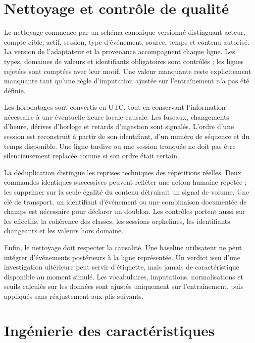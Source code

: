 \documentclass[11pt,a4paper,oneside]{report}
\theoremstyle{definition}
\theoremstyle{plain}
\begin{document}
\section{Nettoyage et contrôle de qualité}

Le nettoyage commence par un schéma canonique versionné distinguant acteur,
compte cible, actif, session, type d'événement, source, temps et contenu
autorisé. La version de l'adaptateur et la provenance accompagnent chaque
ligne. Les types, domaines de valeurs et identifiants obligatoires sont
contrôlés ; les lignes rejetées sont comptées avec leur motif. Une valeur
manquante reste explicitement manquante tant qu'une règle d'imputation ajustée
sur l'entraînement n'a pas été définie.

Les horodatages sont convertis en UTC, tout en conservant l'information
nécessaire à une éventuelle heure locale causale. Les fuseaux, changements
d'heure, dérives d'horloge et retards d'ingestion sont signalés. L'ordre d'une
session est reconstruit à partir de son identifiant, d'un numéro de séquence et
du temps disponible. Une ligne tardive ou une session tronquée ne doit pas être
silencieusement replacée comme si son ordre était certain.

La déduplication distingue les reprises techniques des répétitions réelles. Deux
commandes identiques successives peuvent refléter une action humaine répétée ;
les supprimer sur la seule égalité du contenu détruirait un signal de volume.
Une clé de transport, un identifiant d'événement ou une combinaison documentée
de champs est nécessaire pour déclarer un doublon. Les contrôles portent aussi
sur les effectifs, la cohérence des classes, les sessions orphelines, les
identifiants changeants et les valeurs hors domaine.

Enfin, le nettoyage doit respecter la causalité. Une baseline utilisateur ne
peut intégrer d'événements postérieurs à la ligne représentée. Un verdict issu
d'une investigation ultérieure peut servir d'étiquette, mais jamais de
caractéristique disponible au moment simulé. Les vocabulaires, imputations,
normalisations et seuils calculés sur les données sont ajustés uniquement sur
l'entraînement, puis appliqués sans réajustement aux plis suivants.

\section{Ingénierie des caractéristiques}
\end{document}
